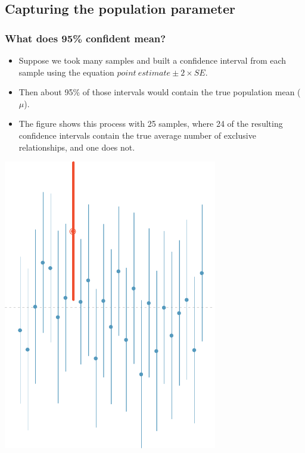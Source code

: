 
\subsection{Capturing the population parameter}


\begin{frame}
\frametitle{What does 95\% confident mean?}

\begin{itemize}

\item Suppose we took many samples and built a confidence interval from each sample using the equation $point~estimate \pm 2 \times SE$.

\item Then about 95\% of those intervals would contain the true population mean ($\mu$). 

\end{itemize}

{
\begin{itemize}

\item The figure shows this process with 25 samples, where 24 of the resulting confidence intervals contain the true average number of exclusive relationships, and one does not.

\end{itemize}
}
{
\includegraphics[width=0.7\textwidth]{4-2_conf_int/figures/95PercentConfidenceInterval/95PercentConfidenceInterval2}
}

\end{frame}

